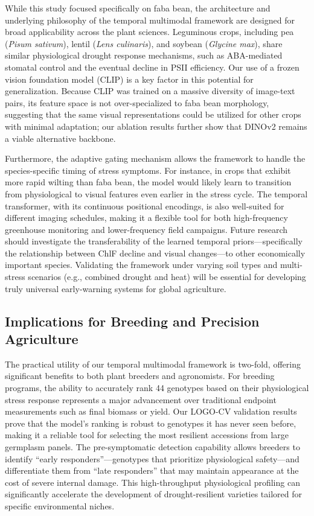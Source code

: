 \documentclass[a4paper,fleqn]{cas-dc}
\begin{document}
While this study focused specifically on faba bean, the architecture and underlying philosophy of the temporal multimodal framework are designed for broad applicability across the plant sciences. Leguminous crops, including pea (\textit{Pisum sativum}), lentil (\textit{Lens culinaris}), and soybean (\textit{Glycine max}), share similar physiological drought response mechanisms, such as ABA-mediated stomatal control and the eventual decline in PSII efficiency. Our use of a frozen vision foundation model (CLIP) is a key factor in this potential for generalization. Because CLIP was trained on a massive diversity of image-text pairs, its feature space is not over-specialized to faba bean morphology, suggesting that the same visual representations could be utilized for other crops with minimal adaptation; our ablation results further show that DINOv2 remains a viable alternative backbone.

Furthermore, the adaptive gating mechanism allows the framework to handle the species-specific timing of stress symptoms. For instance, in crops that exhibit more rapid wilting than faba bean, the model would likely learn to transition from physiological to visual features even earlier in the stress cycle. The temporal transformer, with its continuous positional encodings, is also well-suited for different imaging schedules, making it a flexible tool for both high-frequency greenhouse monitoring and lower-frequency field campaigns. Future research should investigate the transferability of the learned temporal priors---specifically the relationship between ChlF decline and visual changes---to other economically important species. Validating the framework under varying soil types and multi-stress scenarios (e.g., combined drought and heat) will be essential for developing truly universal early-warning systems for global agriculture.

\subsection{Implications for Breeding and Precision Agriculture}\label{sec:discussion:implications}

The practical utility of our temporal multimodal framework is two-fold, offering significant benefits to both plant breeders and agronomists. For breeding programs, the ability to accurately rank 44 genotypes based on their physiological stress response represents a major advancement over traditional endpoint measurements such as final biomass or yield. Our LOGO-CV validation results prove that the model's ranking is robust to genotypes it has never seen before, making it a reliable tool for selecting the most resilient accessions from large germplasm panels. The pre-symptomatic detection capability allows breeders to identify ``early responders''---genotypes that prioritize physiological safety---and differentiate them from ``late responders'' that may maintain appearance at the cost of severe internal damage. This high-throughput physiological profiling can significantly accelerate the development of drought-resilient varieties tailored for specific environmental niches.
\end{document}
